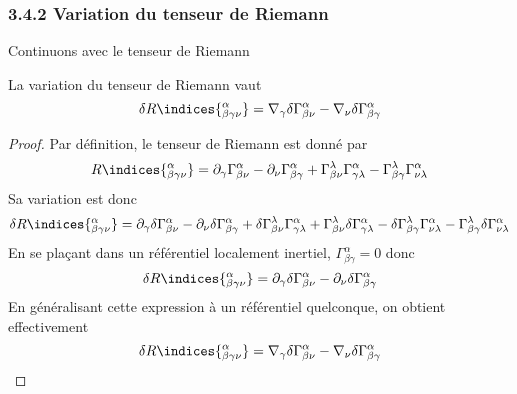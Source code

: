 \subsubsection{3.4.2 Variation du tenseur de Riemann}
Continuons avec le tenseur de Riemann
\begin{theoremframe}
    \begin{propri}
        La variation du tenseur de Riemann vaut
        \begin{equation}
            \delta R\indices{^{\alpha}_{\beta \gamma \nu}} = \nabla_{\gamma}\delta\Gamma^{\alpha}_{\beta \nu} - \nabla_{\nu} \delta \Gamma^{\alpha}_{\beta \gamma}
        \end{equation}
    \end{propri}
\end{theoremframe}
\begin{proof}
    Par définition, le tenseur de Riemann est donné par
    \begin{equation}
        R\indices{^{\alpha}_{ \beta \gamma \nu}} = \partial_{\gamma}\Gamma^{\alpha}_{\beta \nu} - \partial_{\nu} \Gamma^{\alpha}_{\beta \gamma} + \Gamma^{\lambda}_{\beta \nu}\Gamma^{\alpha}_{\gamma \lambda} - \Gamma^{\lambda}_{\beta \gamma}\Gamma^{\alpha}_{\nu \lambda}
    \end{equation}
    Sa variation est donc
    \begin{align}
        \delta R\indices{^{\alpha}_{\beta \gamma \nu}} = \partial_{\gamma}\delta\Gamma^{\alpha}_{\beta \nu} - \partial_{\nu} \delta \Gamma^{\alpha}_{\beta \gamma} + \delta\Gamma^{\lambda}_{\beta \nu}\Gamma^{\alpha}_{\gamma \lambda} + \Gamma^{\lambda}_{\beta \nu}\delta\Gamma^{\alpha}_{\gamma \lambda}- \delta\Gamma^{\lambda}_{\beta \gamma}\Gamma^{\alpha}_{\nu \lambda} - \Gamma^{\lambda}_{\beta \gamma}\delta\Gamma^{\alpha}_{\nu \lambda}
    \end{align}
    En se plaçant dans un référentiel localement inertiel, $\Gamma^{\alpha}_{\beta \gamma} = 0$ donc
    \begin{equation}
        \delta R\indices{^{\alpha}_{\beta \gamma \nu}} = \partial_{\gamma}\delta\Gamma^{\alpha}_{\beta \nu} - \partial_{\nu} \delta \Gamma^{\alpha}_{\beta \gamma}
    \end{equation}
    En généralisant cette expression à un référentiel quelconque, on obtient effectivement
    \begin{equation}
        \delta R\indices{^{\alpha}_{\beta \gamma \nu}} = \nabla_{\gamma}\delta\Gamma^{\alpha}_{\beta \nu} - \nabla_{\nu} \delta \Gamma^{\alpha}_{\beta \gamma}
    \end{equation}
\end{proof}
